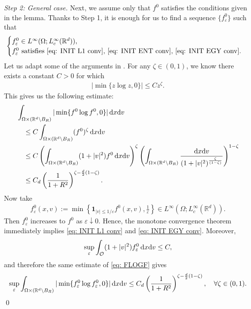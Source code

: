 \documentclass[10pt, reqno]{amsart}
\theoremstyle{plain}
\theoremstyle{definition}
\theoremstyle{remark}
\renewenvironment{proof}[1][\proofname]{\noindent{\scshape #1.\quad}}{\qed}
\numberwithin{equation}{section}
\newcommand{\calO}{\mathcal O}
\newcommand{\R}{\mathbb{R}}
\newcommand{\ve}{\varepsilon}
\newcommand{\dx}{\textnormal{d}x}
\newcommand{\dv}{\textnormal{d}v}
\newcommand{\lt}{\left}
\newcommand{\rt}{\right}
\begin{document}
\begin{proof}
    \textit{Step 2: General case.} Next, we assume only that $f^0$ satisfies the conditions given in the lemma. Thanks to Step 1, it is enough for us to find a sequence $\{f_\ve^0\}$ such that
    \begin{align*}
        \begin{cases}
        f_\ve^0\in L^\infty(\Omega;L^\infty_c(\R^d)),\\
        \textnormal{$f_\ve^0$ satisfies \eqref{eq: INIT L1 conv}, \eqref{eq: INIT ENT conv}, \eqref{eq: INIT EGY conv}}.
        \end{cases}
    \end{align*}
    Let us adapt some of the arguments in \cite{JKO98}. For any $\zeta\in (0,1)$, we know there exists a constant $C>0$ for which
    \begin{align*}
        |\min\{z\log z, 0 \}| \le C z^\zeta.
    \end{align*}
    This gives us the following estimate:
    \begin{equation} \label{eq: FLOGF}
    \begin{split}
        &\int_{\Omega\times (\R^d\setminus B_R)} |\min\{f^0 \log f^0, 0\}| \,\dx\dv \\
        &\quad \le C \int_{\Omega\times (\R^d\setminus B_R)} (f^0)^\zeta \,\dx\dv \\
        &\quad  \le C\lt(\int_{\Omega\times(\R^d\setminus B_R)} (1+|v|^2) f^0 \,\dx\dv \rt)^{\zeta} \lt(\int_{\Omega\times (\R^d\setminus B_R)} \frac{\dx\dv}{(1+|v|^2)^{\frac{\zeta}{(1-\zeta)}}}\rt)^{1-\zeta} \\
        &\quad  \le C_d \lt(\frac{1}{1+R^2}\rt)^{\zeta - \frac{d}{2}(1-\zeta)}.
    \end{split}\end{equation}
    Now take
    \begin{align*}
        f_\ve^0(x,v) := \min\lt\{\mathbf{1}_{|v|\le 1/\ve} f^0(x,v), \frac{1}{\ve} \rt\} \in L^\infty(\Omega;L^\infty_c(\R^d)).
    \end{align*}
    Then $f_\ve^0$ increases to $f^0$ as $\ve\downarrow 0$. Hence, the monotone convergence theorem immediately implies \eqref{eq: INIT L1 conv} and \eqref{eq: INIT EGY conv}. Moreover,
    \begin{align*}
        \sup_{\ve} \int_{\calO} (1+|v|^2) f_\ve^0 \,\dx\dv \le C,
    \end{align*}
    and therefore the same estimate of \eqref{eq: FLOGF} gives
    \begin{align*}
        \sup_\ve \int_{\Omega\times (\R^d\setminus B_R)} |\min\{f_\ve^0 \log f_\ve^0 , 0 \}|\,\dx\dv  \le C_d  \lt(\frac{1}{1+R^2}\rt)^{\zeta - \frac{d}{2}(1-\zeta)}, \quad \forall \zeta \in (0,1).

\end{align*}
\end{proof}
\end{document}
